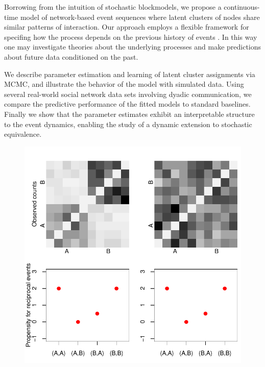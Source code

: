 %


Borrowing from the intuition of stochastic blockmodels, we propose a continuous-time model of network-based event sequences where latent clusters of nodes share similar patterns of interaction.
Our approach employs a flexible framework for  specifing how the process depends on the previous history of events \cite{AalenOddO.2008, Butts2008}.
In this way one may investigate theories about the underlying processes and make predictions about future data conditioned on the past.

We describe parameter estimation and learning of  latent cluster assignments via MCMC, and illustrate the behavior of the model  with simulated data.
Using several real-world social network data sets involving dyadic communication, we compare the predictive performance of the fitted models to standard baselines.
Finally we show that the parameter estimates exhibit an interpretable structure to the event dynamics, enabling the study of a dynamic extension to stochastic equivalence.

\begin{figure}
\centering
\includegraphics[scale=.8]{../figs/introexample/all}
\caption{}
\label{fig:example}
\end{figure}
